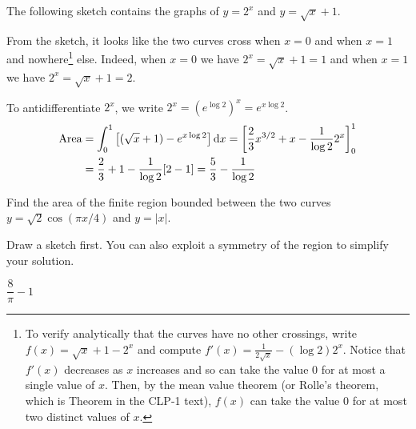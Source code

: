 \begin{solution}
The following sketch contains the graphs of $y=2^x$ and $y=\sqrt{x}+1$.

\begin{center}
\end{center}

From the sketch, it looks like the two curves cross when $x=0$ and when $x=1$ and nowhere\footnote{To verify analytically that the curves have no other crossings, write $f(x)=\sqrt{x}+1-2^x$ and compute $f'(x)= \frac{1}{2\sqrt{x}}-(\log 2)2^x$. Notice that $f'(x)$ decreases as $x$ increases and so can take the value $0$ for at most a single value of $x$. Then, by the mean value theorem (or Rolle's theorem, which is Theorem  in the CLP-1 text), $f(x)$ can take the value $0$ for at most two distinct values of $x$.} else. Indeed, when $x=0$ we have $2^x=\sqrt{x}+1=1$ and when $x=1$ we have $2^x=\sqrt{x}+1=2$. 

To antidifferentiate $2^x$, we write $2^x={(e^{\log 2})}^x=e^{x\log 2}$.
\begin{align*}
\text{Area} &= \int_0^1\big[(\sqrt{x}+1)-e^{x\log 2}\big]\,\mathrm{d}x
=\left[\frac{2}{3}x^{3/2}+x-\frac{1}{\log 2} 2^x\right]_0^1 \\
&=\frac{2}{3}+1-\frac{1}{\log 2}[2-1]
=\frac{5}{3}-\frac{1}{\log 2}
\end{align*}
\end{solution}


\begin{question}[2014A]
Find the area of the finite region bounded between the two curves
$y = \sqrt{2} \cos(\pi x/4)$ and $y = |x|$.
\end{question}

\begin{hint}
Draw a sketch first. You can also exploit a symmetry of the region
to simplify your solution.
\end{hint}

\begin{answer}
$\dfrac{8}{\pi}-1$
\end{answer}

